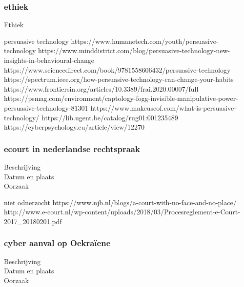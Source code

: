 {{{{{{{{{\subsubsection{ethiek}


Ethiek 



persuasive technology 
https://www.humanetech.com/youth/persuasive-technology 
\cite{humanTechpersuasiveTech}
https://www.minddistrict.com/blog/persuasive-technology-new-insights-in-behavioural-change 
https://www.sciencedirect.com/book/9781558606432/persuasive-technology 
https://spectrum.ieee.org/how-persuasive-technology-can-change-your-habits 
\cite{rezenfeld01012018persuasiveTecgHabits}
https://www.frontiersin.org/articles/10.3389/frai.2020.00007/full 
\cite{aldenaini28042020persuasiveTechTrends}
https://psmag.com/environment/captology-fogg-invisible-manipulative-power-persuasive-technology-81301 
\cite{larson14062017persuasivetechmanipulates}
https://www.makeuseof.com/what-is-persuasive-technology/ 
\cite{tanzem22012022persuasivetechchanginglives}
https://lib.ugent.be/catalog/rug01:001235489 
https://cyberpsychology.eu/article/view/12270 
\cite{tikkakuddonenpersuasiveTechnology}



\subsubsection{ecourt in nederlandse rechtspraak}

\begin{description}
\item[Beschrijving]
\item[Datum en plaats] 
\item[Oorzaak]
\end{description}
niet odnerzocht
https://www.njb.nl/blogs/a-court-with-no-face-and-no-place/ 
\cite{sprongken19032018CourtProcedureDigital}
http://www.e-court.nl/wp-content/uploads/2018/03/Procesreglement-e-Court-2017_20180201.pdf
\cite{PROCESREGLEMENTEcourt}


\subsubsection{ cyber aanval op Oekraïene }

\begin{description}
\item[Beschrijving]
\item[Datum en plaats] 
\item[Oorzaak]
\end{description}

}}}}}}}}}
